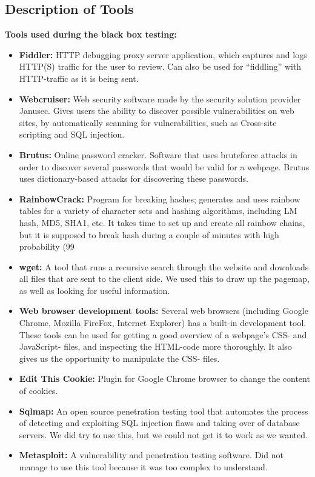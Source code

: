\pagebreak

\subsection{Description of Tools}

{\bf Tools used during the black box testing:}
\begin{itemize}
	\item {\bf Fiddler:} HTTP debugging proxy server application, which captures and logs HTTP(S) traffic for the user to review. Can also be used for “fiddling” with HTTP-traffic as it is being sent.
	\item {\bf Webcruiser:} Web security software made by the security solution provider Janusec. Gives users the ability to discover possible vulnerabilities on web sites, by automatically scanning for vulnerabilities, such as Cross-site scripting and SQL injection.
	\item {\bf Brutus:} Online password cracker. Software that uses bruteforce attacks in order to discover several passwords that would be valid for a webpage. Brutus uses dictionary-based attacks for discovering these passwords.
	\item {\bf RainbowCrack:} Program for breaking hashes; generates and uses rainbow tables for a variety of character sets and hashing algorithms, including LM hash, MD5, SHA1, etc. It takes time to set up and create all rainbow chains, but it is supposed to break hash during a couple of minutes with high probability (99%
	\item {\bf wget:} A tool that runs a recursive search through the website and downloads all files that are sent to the client side. We used this to draw up the pagemap, as well as looking for useful information.
	\item {\bf Web browser development tools:} Several web browsers (including Google Chrome, Mozilla FireFox, Internet Explorer) has a built-in development tool. These tools can be used for getting a good overview of a webpage’s CSS- and JavaScript- files, and inspecting the HTML-code more thoroughly. It also gives us the opportunity to manipulate the CSS- files.
	\item {\bf Edit This Cookie:} Plugin for Google Chrome browser to change the content of cookies.
	\item {\bf Sqlmap:} An open source penetration testing tool that automates the process of detecting and exploiting SQL injection flaws and taking over of database servers. We did try to use this, but we could not get it to work as we wanted.
	\item {\bf Metasploit:} A vulnerability and penetration testing software. Did not manage to use this tool because it was too complex to understand.
\end{itemize}

